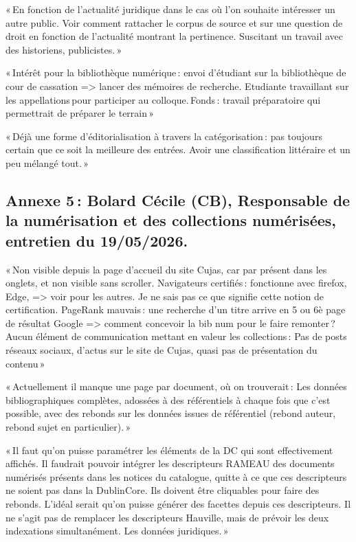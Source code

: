 « En fonction de l’actualité juridique dans le cas où l’on souhaite intéresser un autre public. Voir comment rattacher le corpus de source et sur une question de droit en fonction de l’actualité montrant la pertinence. Suscitant un travail avec des historiens, publicistes. » 

« Intérêt pour la bibliothèque numérique : envoi d’étudiant sur la bibliothèque de cour de cassation => lancer des mémoires de recherche. Etudiante travaillant sur les appellations pour participer au colloque. Fonds : travail préparatoire qui permettrait de préparer le terrain »  

« Déjà une forme d’éditorialisation à travers la catégorisation : pas toujours certain que ce soit la meilleure des entrées. Avoir une classification littéraire et un peu mélangé tout. » 

\subsection*{Annexe 5 : Bolard Cécile (CB), Responsable de la numérisation et des collections numérisées, entretien du 19/05/2026.}

« Non visible depuis la page d’accueil du site Cujas, car par présent dans les onglets, et non visible sans scroller. Navigateurs certifiés : fonctionne avec firefox, Edge, => voir pour les autres. Je ne sais pas ce que signifie cette notion de certification. PageRank mauvais : une recherche d’un titre arrive en 5 ou 6è page de résultat Google => comment concevoir la bib num pour le faire remonter ? Aucun élément de communication mettant en valeur les collections : Pas de posts réseaux sociaux, d’actus sur le site de Cujas, quasi pas de présentation du contenu » 

« Actuellement il manque une page par document, où on trouverait : Les données bibliographiques complètes, adossées à des référentiels à chaque fois que c’est possible, avec des rebonds sur les données issues de référentiel (rebond auteur, rebond sujet en particulier). » 

« Il faut qu’on puisse paramétrer les éléments de la DC qui sont effectivement affichés. Il faudrait pouvoir intégrer les descripteurs RAMEAU des documents numérisés présents dans les notices du catalogue, quitte à ce que ces descripteurs ne soient pas dans la DublinCore. Ils doivent être cliquables pour faire des rebonds. L’idéal serait qu’on puisse générer des facettes depuis ces descripteurs. Il ne s’agit pas de remplacer les descripteurs Hauville, mais de prévoir les deux indexations simultanément. Les données juridiques. » 

